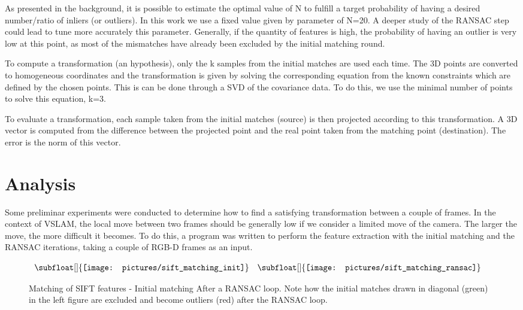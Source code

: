 As presented in the background, it is possible to estimate the optimal value of N to fulfill a target probability of having a desired number/ratio of inliers (or outliers). In this work we use a fixed value given by parameter of N=20. A deeper study of the \gls{RANSAC} step could lead to tune more accurately this parameter. Generally, if the quantity of features is high, the probability of having an outlier is very low at this point, as most of the mismatches have already been excluded by the initial matching round.


To compute a transformation (an hypothesis), only the k samples from the initial matches are used each time. The 3D points are converted to homogeneous coordinates and the transformation is given by solving the corresponding equation from the known constraints which are defined by the chosen points. This is can be done through a \gls{SVD} of the covariance data. To do this, we use the minimal number of points to solve this equation, k=3.

To evaluate a transformation, each sample taken from the initial matches (source) is then projected according to this transformation. A 3D vector is computed from the difference between the projected point and the real point taken from the matching point (destination). The error is the norm of this vector.

\section{Analysis}

Some preliminar experiments were conducted to determine how to find a satisfying transformation between a couple of frames. In the context of \gls{VSLAM}, the local move between two frames should be generally low if we consider a limited move of the camera. The larger the move, the more difficult it becomes. To do this, a program was written to perform the feature extraction with the initial matching and the RANSAC iterations, taking a couple of RGB-D frames as an input.

\begin{figure}[H]
\centering$
 \begin{array}{cc}
 \subfloat[]{\label{fig:sift_match_1} \texttt{[image: pictures/sift\_matching\_init]}} &
 \subfloat[]{\label{fig:sift_match_2} \texttt{[image: pictures/sift\_matching\_ransac]}}
 \end{array}$
\caption{Matching of SIFT features - \protect{} Initial matching \protect{} After a RANSAC loop. Note how the initial matches drawn in diagonal (green) in the left figure are excluded and become outliers (red) after the RANSAC loop.}
\end{figure}

